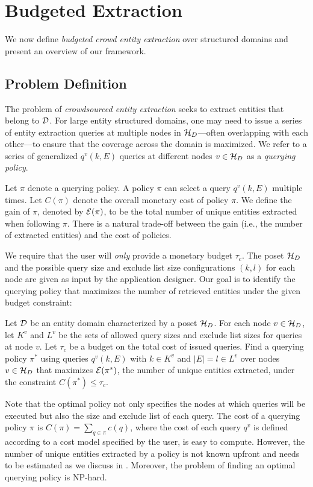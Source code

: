 \section{Budgeted Extraction}
\label{sec:problem}
We now define {\em budgeted crowd entity extraction} over structured domains and present an overview of our framework.
\subsection{Problem Definition}
\label{sec:extraction}
The problem of {\em crowdsourced entity extraction} seeks to extract entities that belong to $\mathcal{D}$.  For large entity structured domains, one may need to issue a series of entity extraction queries at multiple nodes in  $\mathcal{H}_D$---often overlapping with each other---to ensure that the coverage across the domain is maximized. We refer to a series of  generalized $q^v(k,E)$ queries at different nodes $v \in \mathcal{H}_D$ as a {\em querying policy}.

Let $\pi$ denote a querying policy. A policy $\pi$ can select a query $q^v(k,E)$ multiple times. Let $C(\pi)$ denote the overall monetary cost of policy $\pi$. We define the gain of $\pi$, denoted by $\mathcal{E}(\pi)$, to be the total number of unique entities extracted when following $\pi$. There is a natural trade-off between the gain (i.e., the number of extracted entities) and the cost of policies. 

We require that the user will {\em only} provide a monetary budget $\tau_c$. The poset $\mathcal{H}_D$ and the possible query size and exclude list size configurations $(k,l)$ for each node are given as input by the application designer. Our goal is to identify the querying policy that maximizes the number of retrieved entities under the given budget constraint:

\begin{problem}\label{prob:budgeted}
Let $\mathcal{D}$ be an entity domain characterized by a poset $\mathcal{H}_D$. For each node $v \in \mathcal{H}_D$, let $K^v$ and $L^v$ be the sets of allowed query sizes and exclude list sizes for queries at node $v$. Let $\tau_c$ be a budget on the total cost of issued queries. Find a querying policy $\pi^*$ using queries $q^v(k,E)$ with $k \in K^v$ and $|E| = l \in L^v$ over nodes $v \in \mathcal{H}_D$ that maximizes $\mathcal{E}(\pi^*)$, the number of unique entities extracted, under the constraint $C(\pi^*) \leq \tau_c$.
\end{problem}
Note that the optimal policy not only specifies the nodes at which queries will be executed but also the size and exclude list of each query. The cost of a querying policy $\pi$ is $C(\pi) = \sum_{q \in \pi} c(q)$, where the cost of each query $q^v$ is defined according to a cost model specified by the user, is easy to compute. However, the number of unique entities extracted by a policy is not known upfront and needs to be estimated as we discuss in . Moreover, the problem of finding an optimal querying policy is NP-hard. 

